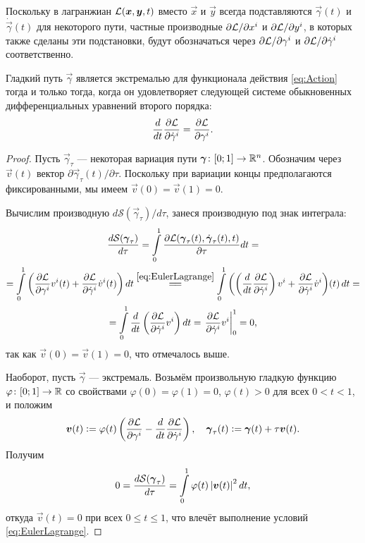 Поскольку в лагранжиан $\mathcal{L}(\boldsymbol{x}, \boldsymbol{y}, t)$ вместо $\vec{x}$ и $\vec{y}$ всегда подставляются $\vec{\gamma}(t)$ и $\dot{\vec{\gamma}}(t)$ для некоторого пути, частные производные $\partial\mathcal{L} / \partial x^i$ и $\partial\mathcal{L} / \partial y^i$, в которых также сделаны эти подстановки, будут обозначаться через $\partial\mathcal{L} / \partial\gamma^i$ и $\partial\mathcal{L} / \partial\dot{\gamma}^i$ соответственно.

\begin{lemma}
	Гладкий путь $\vec{\gamma}$ является экстремалью для функционала действия \eqref{eq:Action} тогда и только тогда, когда он удовлетворяет следующей системе обыкновенных дифференциальных уравнений второго порядка:
	\begin{equation} \label{eq:EulerLagrange}
		\frac{d}{dt}\frac{\partial\mathcal{L}}{\partial\dot{\gamma}^i} = \frac{\partial\mathcal{L}}{\partial\gamma^i}.
	\end{equation}
\end{lemma}

\begin{proof}
	Пусть $\vec{\gamma}_\tau$ --- некоторая вариация пути $\vec{\gamma}\colon [0; 1] \hm\to \R^n$. Обозначим через $\vec{v}(t)$ вектор $\partial\vec{\gamma}_\tau(t) / \partial\tau$. Поскольку при вариации концы предполагаются фиксированными, мы имеем $\vec{v}(0) = \vec{v}(1) = 0$.

	\noindent
	Вычислим производную $d\mathcal{S}(\vec{\gamma}_\tau) / d\tau$, занеся производную под знак интеграла:
	\begin{multline*}
		\frac{d\mathcal{S}(\vec{\gamma}_\tau)}{d\tau} = \int\limits_0^1\frac{\partial\L(\vec{\gamma}_\tau(t), \dot{\vec{\gamma}}_\tau(t), t)}{\partial\tau}dt =\\ = \int\limits_0^1\br{\frac{\partial\L}{\partial\gamma^i}v^i(t) + \frac{\partial\L}{\partial\dot{\gamma}^i}\dot{v}^i(t)}dt \stackrel{\eqref{eq:EulerLagrange}}{=\joinrel=} \int\limits_0^1\br{\br{\frac{d}{dt}\frac{\partial\L}{\partial\dot{\gamma}^i}}v^i + \frac{\partial\L}{\partial\dot{\gamma}^i}\dot{v}^i}\!(t)\,dt =\\ = \int\limits_0^1\frac{d}{dt}\br{\frac{\partial\L}{\partial\dot{\gamma}^i}v^i}dt = \left.\frac{\partial\L}{\partial\dot{\gamma}^i}v^i\right|_0^1 = 0,
	\end{multline*}
	так как $\vec{v}(0) = \vec{v}(1) = 0$, что отмечалось выше.

	Наоборот, пусть $\vec{\gamma}$ --- экстремаль. Возьмём произвольную гладкую функцию $\varphi\colon [0; 1] \to \mathbb{R}$ со свойствами $\varphi(0) = \varphi(1) = 0$, $\varphi(t) > 0$ для всех $0 < t < 1$, и положим
	\[
		\boldsymbol{v}(t) \vcentcolon = \varphi(t)\left(\frac{\partial\mathcal{L}}{\partial\gamma^i} - \frac{d}{dt}\frac{\partial\mathcal{L}}{\partial\dot{\gamma}^i}\right),\quad \boldsymbol{\gamma}_\tau(t) \vcentcolon = \boldsymbol{\gamma}(t) + \tau\boldsymbol{v}(t).
	\]
	Получим
	\[
		0 = \frac{d\mathcal{S}(\boldsymbol{\gamma}_\tau)}{d\tau} = \int\limits_0^1\varphi(t)\left\lvert\boldsymbol{v}(t)\right\rvert^2dt,
	\]
	откуда $\vec{v}(t) = 0$ при всех $0 \leqslant t \leqslant 1$, что влечёт выполнение условий \eqref{eq:EulerLagrange}.
\end{proof}

